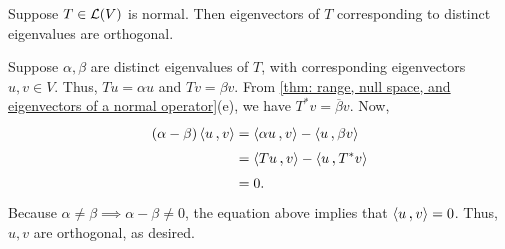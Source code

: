 \begin{thm}
  Suppose $T\in \mathcal{L}(V)$ is normal. Then eigenvectors of $T$ corresponding to distinct eigenvalues are orthogonal.
\end{thm}
\begin{prf}
  Suppose $\alpha, \beta$ are distinct eigenvalues of $T$, with corresponding eigenvectors $u,v \in V$. Thus, $Tu=\alpha u$ and $Tv = \beta v$. From \ref{thm: range, null space, and eigenvectors of a normal operator}(e), we have $T^*v = \overline \beta v$. Now,
  \[
    \begin{aligned}
      (\alpha -\beta) \ip{u}{v}
      & = \ip{\alpha u}{v}- \ip{u}{\beta v} \\
      & = \ip{Tu}{v}-\ip{u}{T^*v} \\
      & = 0.
    \end{aligned}
  \]
  Because $\alpha \neq \beta \implies \alpha - \beta \neq 0$, the equation above implies that $\ip{u}{v} = 0$. Thus, $u, v$ are orthogonal, as desired.
\end{prf}

